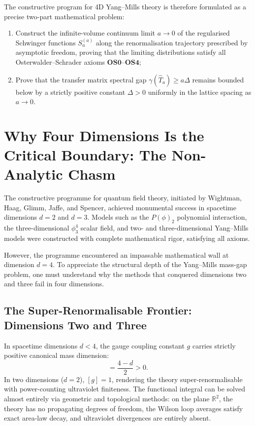 The constructive program for 4D Yang--Mills theory is therefore formulated as a precise two-part mathematical problem:
\begin{enumerate}
    \item Construct the infinite-volume continuum limit $a \to 0$ of the regularised Schwinger functions $S_n^{(a)}$ along the renormalisation trajectory prescribed by asymptotic freedom, proving that the limiting distributions satisfy all Osterwalder--Schrader axioms $\mathbf{OS0}$--$\mathbf{OS4}$;
    \item Prove that the transfer matrix spectral gap $\gamma(\hat{T}_a) \ge a \Delta$ remains bounded below by a strictly positive constant $\Delta > 0$ uniformly in the lattice spacing as $a \to 0$.
\end{enumerate}


\section{Why Four Dimensions Is the Critical Boundary: The Non-Analytic Chasm}
\label{sec:four_dimensions_critical}

The constructive programme for quantum field theory, initiated by Wightman, Haag, Glimm, Jaffe, and Spencer, achieved monumental success in spacetime dimensions $d = 2$ and $d = 3$. Models such as the $P(\phi)_2$ polynomial interaction, the three-dimensional $\phi_3^4$ scalar field, and two- and three-dimensional Yang--Mills models \cite{GlimmJaffe1987} were constructed with complete mathematical rigor, satisfying all axioms.

However, the programme encountered an impassable mathematical wall at dimension $d = 4$. To appreciate the structural depth of the Yang--Mills mass-gap problem, one must understand why the methods that conquered dimensions two and three fail in four dimensions.

\subsection{The Super-Renormalisable Frontier: Dimensions Two and Three}
\label{subsec:super_renormalisable}
In spacetime dimensions $d < 4$, the gauge coupling constant $g$ carries strictly positive canonical mass dimension:
\begin{equation}
[g] = \frac{4 - d}{2} > 0.
\end{equation}
In two dimensions ($d = 2$), $[g] = 1$, rendering the theory super-renormalisable with power-counting ultraviolet finiteness. The functional integral can be solved almost entirely via geometric and topological methods: on the plane $\mathbb{R}^2$, the theory has no propagating degrees of freedom, the Wilson loop averages satisfy exact area-law decay, and ultraviolet divergences are entirely absent.

